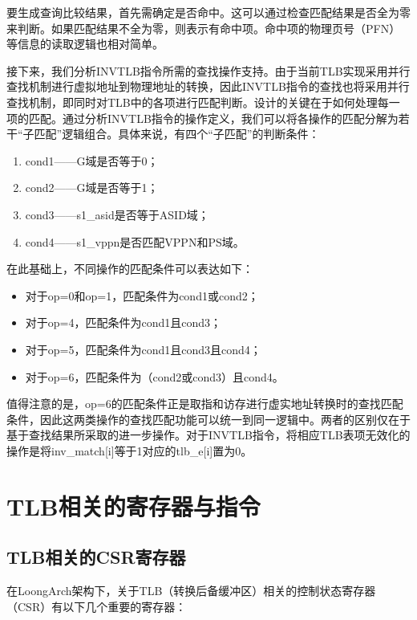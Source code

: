 要生成查询比较结果，首先需确定是否命中。这可以通过检查匹配结果是否全为零来判断。如果匹配结果不全为零，则表示有命中项。命中项的物理页号（PFN）等信息的读取逻辑也相对简单。

接下来，我们分析INVTLB指令所需的查找操作支持。由于当前TLB实现采用并行查找机制进行虚拟地址到物理地址的转换，因此INVTLB指令的查找也将采用并行查找机制，即同时对TLB中的各项进行匹配判断。设计的关键在于如何处理每一项的匹配。通过分析INVTLB指令的操作定义，我们可以将各操作的匹配分解为若干``子匹配''逻辑组合。具体来说，有四个``子匹配''的判断条件：

\begin{enumerate}
\def\labelenumi{\arabic{enumi}.}
\item
  cond1------G域是否等于0；
\item
  cond2------G域是否等于1；
\item
  cond3------s1\_asid是否等于ASID域；
\item
  cond4------s1\_vppn是否匹配VPPN和PS域。
\end{enumerate}

在此基础上，不同操作的匹配条件可以表达如下：

\begin{itemize}
\tightlist
\item
  对于op=0和op=1，匹配条件为cond1或cond2；
\item
  对于op=4，匹配条件为cond1且cond3；
\item
  对于op=5，匹配条件为cond1且cond3且cond4；
\item
  对于op=6，匹配条件为（cond2或cond3）且cond4。
\end{itemize}

值得注意的是，op=6的匹配条件正是取指和访存进行虚实地址转换时的查找匹配条件，因此这两类操作的查找匹配功能可以统一到同一逻辑中。两者的区别仅在于基于查找结果所采取的进一步操作。对于INVTLB指令，将相应TLB表项无效化的操作是将inv\_match{[}i{]}等于1对应的tlb\_e{[}i{]}置为0。

\section{TLB相关的寄存器与指令}\label{sec:10-mmu-009}

\subsection{TLB相关的CSR寄存器}\label{sec:10-mmu-010}

在LoongArch架构下，关于TLB（转换后备缓冲区）相关的控制状态寄存器（CSR）有以下几个重要的寄存器：

